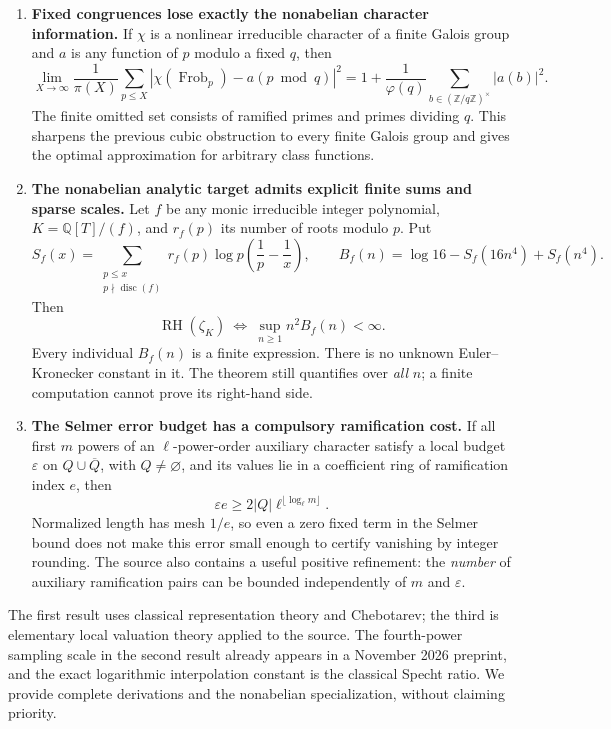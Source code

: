 \documentclass[11pt,letterpaper]{article}
\theoremstyle{definition}
\theoremstyle{remark}
\newcommand{\Q}{\mathbb Q}
\newcommand{\Z}{\mathbb Z}
\DeclareMathOperator{\Frob}{Frob}
\DeclareMathOperator{\RH}{RH}
\begin{document}
\begin{enumerate}
\item \textbf{Fixed congruences lose exactly the nonabelian character
information.} If $\chi$ is a nonlinear irreducible character of a finite
Galois group and $a$ is any function of $p$ modulo a fixed $q$, then
\[
 \lim_{X\to\infty}\frac1{\pi(X)}\sum_{p\le X}
  |\chi(\Frob_p)-a(p\bmod q)|^2
 =1+\frac1{\varphi(q)}\sum_{b\in(\Z/q\Z)^\times}|a(b)|^2.
\]
The finite omitted set consists of ramified primes and primes dividing
$q$. This sharpens the previous cubic obstruction to every finite Galois
group and gives the optimal approximation for arbitrary class functions.

\item \textbf{The nonabelian analytic target admits explicit finite sums
and sparse scales.} Let $f$ be any monic irreducible integer polynomial,
$K=\Q[T]/(f)$, and $r_f(p)$ its number of roots modulo $p$. Put
\[
 S_f(x)=\sum_{\substack{p\le x\\p\nmid\operatorname{disc}(f)}}
 r_f(p)\log p\left(\frac1p-\frac1x\right),\qquad
 B_f(n)=\log16-S_f(16n^4)+S_f(n^4).
\]
Then
\begin{equation}\label{eq:headline-target}
 \boxed{\quad \RH(\zeta_K)\ \Longleftrightarrow\
                  \sup_{n\ge1}n^2B_f(n)<\infty.\quad}
\end{equation}
Every individual $B_f(n)$ is a finite expression. There is no unknown
Euler--Kronecker constant in it. The theorem still quantifies over
\emph{all} $n$; a finite computation cannot prove its right-hand side.

\item \textbf{The Selmer error budget has a compulsory ramification
cost.} If all first $m$ powers of an $\ell$-power-order auxiliary
character satisfy a local budget $\varepsilon$ on $Q\cup\overline Q$,
with $Q\ne\varnothing$, and its values lie in a coefficient ring of
ramification index $e$, then
\[
       \varepsilon e\ge 2|Q|\ell^{\lfloor\log_\ell m\rfloor}.
\]
Normalized length has mesh $1/e$, so even a zero fixed term in the
Selmer bound does not make this error small enough to certify vanishing
by integer rounding. The source also contains a useful positive
refinement: the \emph{number} of auxiliary ramification pairs can be
bounded independently of $m$ and $\varepsilon$.
\end{enumerate}

The first result uses classical representation theory and Chebotarev;
the third is elementary local valuation theory applied to the source.
The fourth-power sampling scale in the second result already appears
in a November 2026 preprint, and the exact logarithmic interpolation
constant is the classical Specht ratio. We provide complete derivations
and the nonabelian specialization, without claiming priority.
\cite{milne,setiawan,specht}
\end{document}
